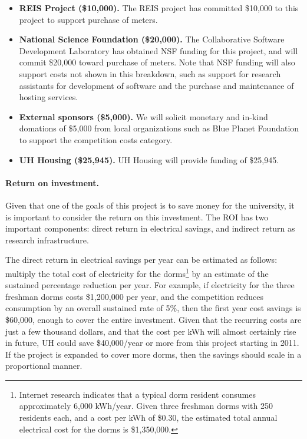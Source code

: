 \documentclass[11pt]{article}
\begin{document}
\begin{itemize}
\item {\bf REIS Project (\$10,000).}  The REIS project has committed \$10,000 to this project to support purchase of meters. 

\item {\bf National Science Foundation (\$20,000).}  The Collaborative Software Development Laboratory has obtained NSF funding for this project, and will commit \$20,000 toward purchase of meters.  Note that NSF funding will also support costs not shown in this breakdown, such as support for research assistants for development of software and the purchase and maintenance of hosting services. 

\item {\bf External sponsors  (\$5,000).}  We will solicit monetary and in-kind domations of \$5,000 from local organizations such as Blue Planet Foundation to support the competition costs category. 

\item {\bf UH Housing  (\$25,945).}  UH Housing will provide funding of \$25,945.
\end{itemize}

\paragraph{Return on investment.}  Given that one of the goals of this
project is to save money for the university, it is important to consider
the return on this investment.  The ROI has two important components:
direct return in electrical savings, and indirect return as research
infrastructure.

The direct return in electrical savings per year can be estimated as
follows: multiply the total cost of electricity for the dorms\footnote{
  Internet research indicates that a typical dorm resident consumes approximately
  6,000 kWh/year. Given three freshman dorms with 250 residents each, and a
  cost per kWh of \$0.30, the estimated total annual electrical cost for the dorms
  is \$1,350,000.} by an estimate of the sustained percentage reduction per
year.  For example, if electricity for the three freshman dorms costs
\$1,200,000 per year, and the competition reduces consumption by an overall
sustained rate of 5\%, then the first year cost savings is \$60,000, 
enough to cover the entire investment.  Given that the recurring costs are
just a few thousand dollars, and that the cost per kWh will almost
certainly rise in future, UH could save \$40,000/year or more from this
project starting in 2011.  If the project is expanded to cover more dorms,
then the savings should scale in a proportional manner.
\end{document}
